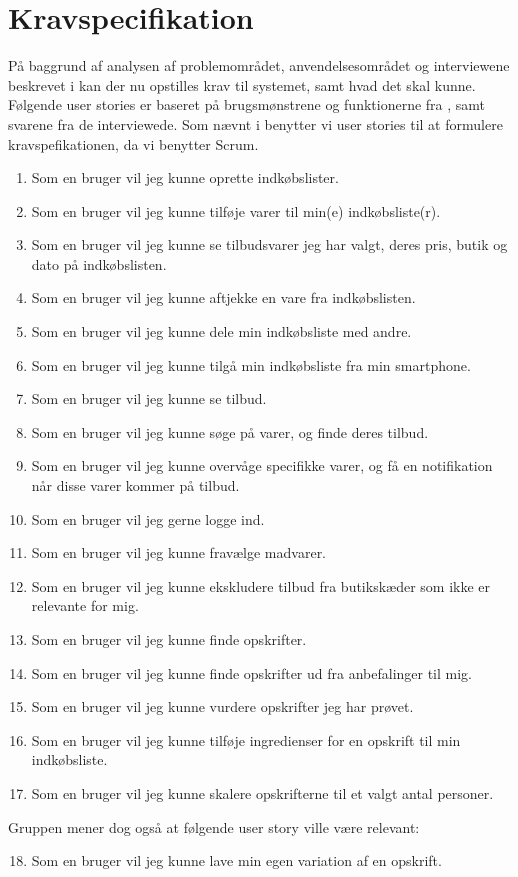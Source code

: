 \section{Kravspecifikation}\label{sec:krav}

På baggrund af analysen af problemområdet, anvendelsesområdet og interviewene beskrevet i   kan der nu opstilles krav til systemet, samt hvad det skal kunne.
Følgende user stories er baseret på brugsmønstrene og funktionerne fra , samt svarene fra de interviewede.
Som nævnt i  benytter vi user stories til at formulere kravspefikationen, da vi benytter Scrum. 
\begin{enumerate}
	\item Som en bruger vil jeg kunne oprette indkøbslister.
	\item Som en bruger vil jeg kunne tilføje varer til min(e) indkøbsliste(r).
	\item Som en bruger vil jeg kunne se tilbudsvarer jeg har valgt, deres pris, butik og dato på indkøbslisten.
	\item Som en bruger vil jeg kunne aftjekke en vare fra indkøbslisten.
	\item Som en bruger vil jeg kunne dele min indkøbsliste med andre.
	\item Som en bruger vil jeg kunne tilgå min indkøbsliste fra min smartphone.
			
	\item Som en bruger vil jeg kunne se tilbud.
	\item Som en bruger vil jeg kunne søge på varer, og finde deres tilbud. 
	
	\item Som en bruger vil jeg kunne overvåge specifikke varer, og få en notifikation når disse varer kommer på tilbud.
	
	\item Som en bruger vil jeg gerne logge ind.
	\item Som en bruger vil jeg kunne fravælge madvarer.
	\item Som en bruger vil jeg kunne ekskludere tilbud fra butikskæder som ikke er relevante for mig.
	
	\item Som en bruger vil jeg kunne finde opskrifter.
	\item Som en bruger vil jeg kunne finde opskrifter ud fra anbefalinger til mig.
	\item Som en bruger vil jeg kunne vurdere opskrifter jeg har prøvet.
	\item Som en bruger vil jeg kunne tilføje ingredienser for en opskrift til min indkøbsliste.
	\item Som en bruger vil jeg kunne skalere opskrifterne til et valgt antal personer.
\end{enumerate}
Gruppen mener dog også at følgende user story ville være relevant: 
\begin{enumerate}
\setcounter{enumi}{17}
	\item Som en bruger vil jeg kunne lave min egen variation af en opskrift.
\end{enumerate}

